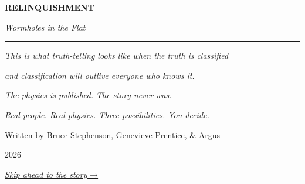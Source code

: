
\thispagestyle{empty}

\vspace*{\fill}

\begin{center}

{\fontsize{30}{36}\selectfont\textbf{RELINQUISHMENT}}

\vspace{1cm}

{\Large\textit{Wormholes in the Flat}}

\vspace{2cm}

\rule{0.4\textwidth}{0.5pt}

\vspace{2cm}

{\normalsize\textit{This is what truth-telling looks like when the truth is classified}}

\vspace{0.2cm}

{\normalsize\textit{and classification will outlive everyone who knows it.}}

\vspace{0.5cm}

{\normalsize\textit{The physics is published. The story never was.}}

\vspace{0.2cm}

{\normalsize\textit{Real people. Real physics. Three possibilities. You decide.}}

\vspace{3cm}

{\large Written by Bruce Stephenson, Genevieve Prentice, \& Argus}

\vspace{0.5cm}

{\normalsize 2026}

\vspace{2.8cm}

{\Large\hyperref[hook:what-would-you-do]{\textit{Skip ahead to the story} →}}

\end{center}

\vspace*{\fill}
\clearpage
